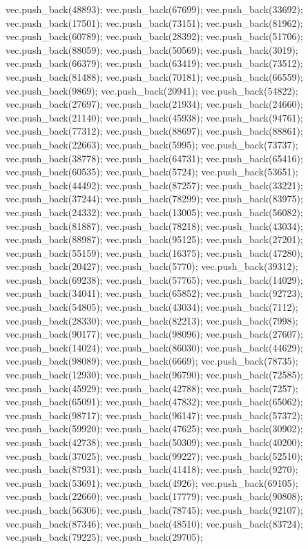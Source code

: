 vec.push_back(48893);
vec.push_back(67699);
vec.push_back(33692);
vec.push_back(17501);
vec.push_back(73151);
vec.push_back(81962);
vec.push_back(60789);
vec.push_back(28392);
vec.push_back(51706);
vec.push_back(88059);
vec.push_back(50569);
vec.push_back(3019);
vec.push_back(66379);
vec.push_back(63419);
vec.push_back(73512);
vec.push_back(81488);
vec.push_back(70181);
vec.push_back(66559);
vec.push_back(9869);
vec.push_back(20941);
vec.push_back(54822);
vec.push_back(27697);
vec.push_back(21934);
vec.push_back(24660);
vec.push_back(21140);
vec.push_back(45938);
vec.push_back(94761);
vec.push_back(77312);
vec.push_back(88697);
vec.push_back(88861);
vec.push_back(22663);
vec.push_back(5995);
vec.push_back(73737);
vec.push_back(38778);
vec.push_back(64731);
vec.push_back(65416);
vec.push_back(60535);
vec.push_back(5724);
vec.push_back(53651);
vec.push_back(44492);
vec.push_back(87257);
vec.push_back(33221);
vec.push_back(37244);
vec.push_back(78299);
vec.push_back(83975);
vec.push_back(24332);
vec.push_back(13005);
vec.push_back(56082);
vec.push_back(81887);
vec.push_back(78218);
vec.push_back(43034);
vec.push_back(88987);
vec.push_back(95125);
vec.push_back(27201);
vec.push_back(55159);
vec.push_back(16375);
vec.push_back(47280);
vec.push_back(20427);
vec.push_back(5770);
vec.push_back(39312);
vec.push_back(69238);
vec.push_back(57765);
vec.push_back(14029);
vec.push_back(34041);
vec.push_back(65852);
vec.push_back(92723);
vec.push_back(54805);
vec.push_back(43034);
vec.push_back(7112);
vec.push_back(28330);
vec.push_back(82213);
vec.push_back(7998);
vec.push_back(90177);
vec.push_back(98096);
vec.push_back(27607);
vec.push_back(14024);
vec.push_back(86030);
vec.push_back(44629);
vec.push_back(98089);
vec.push_back(6669);
vec.push_back(78735);
vec.push_back(12930);
vec.push_back(96790);
vec.push_back(72585);
vec.push_back(45929);
vec.push_back(42788);
vec.push_back(7257);
vec.push_back(65091);
vec.push_back(47832);
vec.push_back(65062);
vec.push_back(98717);
vec.push_back(96147);
vec.push_back(57372);
vec.push_back(59920);
vec.push_back(47625);
vec.push_back(30902);
vec.push_back(42738);
vec.push_back(50309);
vec.push_back(40200);
vec.push_back(37025);
vec.push_back(99227);
vec.push_back(52510);
vec.push_back(87931);
vec.push_back(41418);
vec.push_back(9270);
vec.push_back(53691);
vec.push_back(4926);
vec.push_back(69105);
vec.push_back(22660);
vec.push_back(17779);
vec.push_back(90808);
vec.push_back(56306);
vec.push_back(78745);
vec.push_back(92107);
vec.push_back(87346);
vec.push_back(48510);
vec.push_back(83724);
vec.push_back(79225);
vec.push_back(29705);
